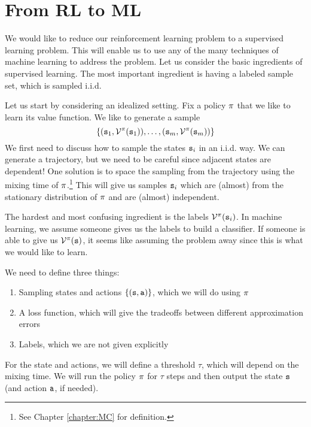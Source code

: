 \section{From RL to ML}

We would like to reduce our reinforcement learning problem to a
supervised learning problem. This will enable us to use any of the
many techniques of machine learning to address the problem. Let us
consider the basic ingredients of supervised learning. The most
important ingredient is having a labeled sample set,
which is sampled i.i.d.

Let us start by considering an idealized setting. Fix a policy
$\pi$ that we like to learn its value function. We like to
generate a sample
\[
\{({\tt s}_1, \mathcal{V}^\pi({\tt s}_1)),\ldots,
({\tt s}_m,\mathcal{V}^\pi({\tt s}_m))\}
\]
We first need to discuss how to sample the states ${\tt s}_i$ in an
i.i.d. way. We can generate a trajectory, but we need to be careful
since adjacent states are dependent! One solution is to
space the sampling from the trajectory using the mixing time of
$\pi$.\footnote{See Chapter \ref{chapter:MC} for definition.}
This will give us samples ${\tt s}_i$ which are (almost) from the
stationary distribution of $\pi$ and are (almost) independent.

The hardest and most confusing ingredient is the labels
$\mathcal{V}^\pi({\tt s}_i)$. In machine learning, we assume someone gives us the labels to build a classifier.
If someone is able to give us
$\mathcal{V}^\pi({\tt s})$, it seems like assuming the problem away
since this is what we would like to learn.

We need to define three things:
\begin{enumerate}
    \item Sampling states and actions $\{({\tt s},{\tt a})\}$, which we will do using $\pi$
    \item A loss function, which will give the tradeoffs between different approximation errors
    \item Labels, which we are not given explicitly
\end{enumerate}
For the state and actions, we will define a threshold $\tau$, which
will depend on the mixing time. We will run the policy $\pi$
for $\tau$ steps and then output the state ${\tt s}$ (and action
${\tt a}$, if needed).

